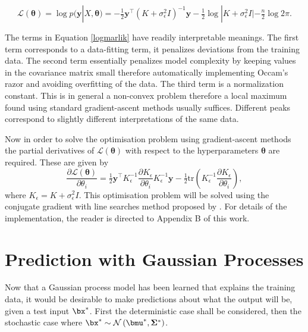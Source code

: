 \begin{equation}\label{logmarlik}
\mathcal{L}(\boldsymbol{\theta})=\log p(\mathbf{y}|X,\boldsymbol{\theta}) = 
-\tfrac{1}{2}\mathbf{y}^\top(K+\sigma^2_\epsilon I)^{-1}\mathbf{y}   
-  \tfrac{1}{2}\log|K+\sigma^2_\epsilon I|   
- \tfrac{n}{2}\log2\pi.
\end{equation}

The terms in Equation \eqref{logmarlik} have readily interpretable meanings. The first term corresponds to a data-fitting term, it penalizes deviations from the training data. The second term essentially penalizes model complexity by keeping values in the covariance matrix small therefore automatically implementing Occam's razor and avoiding overfitting of the data. The third term is a normalization constant. This is in general a non-convex problem therefore a local maximum found using standard gradient-ascent methods usually suffices. Different peaks correspond to slightly different interpretations of the same data.

Now in order to solve the optimisation problem using gradient-ascent methods the partial derivatives of $\mathcal{L}(\boldsymbol{\theta})$ with respect to the hyperparameters $\boldsymbol{\theta}$ are required. These are given by
\begin{equation}
\frac{\partial\mathcal{L}(\boldsymbol{\theta})}{\partial \theta_i} = 
\tfrac{1}{2}\mathbf{y}^\top K_\epsilon^{-1} \frac{\partial K_\epsilon}{\partial \theta_i} K_\epsilon^{-1}\mathbf{y}
- \tfrac{1}{2}\mathrm{tr}\left( K_\epsilon^{-1} \frac{\partial K_\epsilon}{\partial \theta_i} \right),
\end{equation}
where $K_\epsilon = K+\sigma^2_\epsilon I$. This optimisation problem will be solved using the conjugate gradient with line searches method proposed by \cite{Ras96}. For details of the implementation, the reader is directed to Appendix B of this work.



\section{Prediction with Gaussian Processes}
Now that a Gaussian process model has been learned that explains the training data, it would be desirable to make predictions about what the output will be, given a test input $\bx^*$. First the deterministic case shall be considered, then the stochastic case where $\bx^* \sim \mathcal{N}\left(\bmu^*,\mathbf{\Sigma}^*\right)$.

